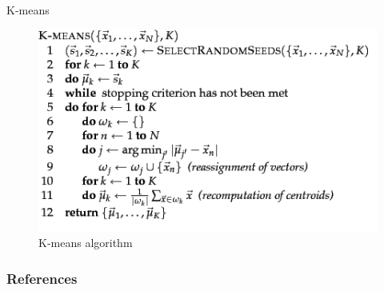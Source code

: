 \documentclass[handout]{beamer}
\begin{document}
\begin{frame}{K-means}
\begin{figure}[h!]
	\centering
	\includegraphics[scale=0.6]{pics/kmeans.png}
	\caption{ K-means algorithm}
\end{figure}


 



 
\end{frame}




\begin{frame}[allowframebreaks]\scriptsize
\frametitle{References}


%
\end{frame}



\end{document}
